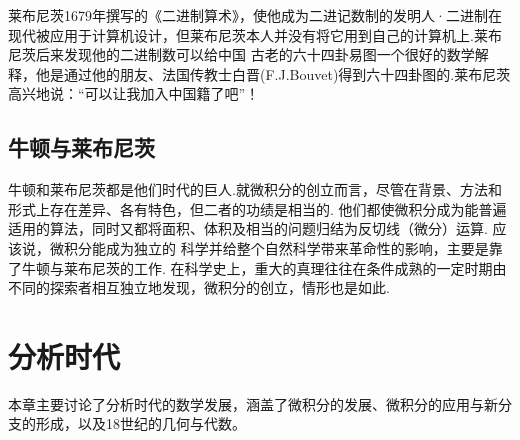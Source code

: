 \documentclass{Math_Note}
\begin{document}
莱布尼茨1679年撰写的《二进制算术》，使他成为二进记数制的发明人·二进制在现代被应用于计算机设计，但莱布尼茨本人并没有将它用到自己的计算机上.莱布尼茨后来发现他的二进制数可以给中国
古老的六十四卦易图一个很好的数学解释，他是通过他的朋友、法国传教士白晋(F.J.Bouvet)得到六十四卦图的.莱布尼茨高兴地说：“可以让我加入中国籍了吧”！

\subsection{牛顿与莱布尼茨}
牛顿和莱布尼茨都是他们时代的巨人.就微积分的创立而言，尽管在背景、方法和形式上存在差异、各有特色，但二者的功绩是相当的. 
他们都使微积分成为能普遍适用的算法，同时又都将面积、体积及相当的问题归结为反切线（微分）运算. 应该说，微积分能成为独立的
科学并给整个自然科学带来革命性的影响，主要是靠了牛顿与莱布尼茨的工作. 在科学史上，重大的真理往往在条件成熟的一定时期由
不同的探索者相互独立地发现，微积分的创立，情形也是如此. 

\section{分析时代}
本章主要讨论了分析时代的数学发展，涵盖了微积分的发展、微积分的应用与新分支的形成，以及18世纪的几何与代数。
\end{document}
